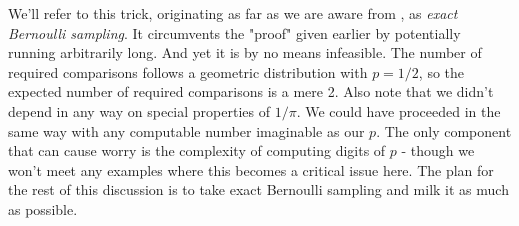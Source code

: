 We'll refer to this trick, originating as far as we are aware from \cite{Knuth-Yao}, as \textit{exact Bernoulli sampling}. It circumvents the "proof" given earlier by potentially running arbitrarily long. And yet it is by no means infeasible. The number of required comparisons follows a geometric distribution with $p=1/2$, so the expected number of required comparisons is a mere 2. Also note that we didn't depend in any way on special properties of $1/\pi$. We could have proceeded in the same way with any computable number imaginable as our $p$. The only component that can cause worry is the complexity of computing digits of $p$ - though we won't meet any examples where this becomes a critical issue here. The plan for the rest of this discussion is to take exact Bernoulli sampling and milk it as much as possible.